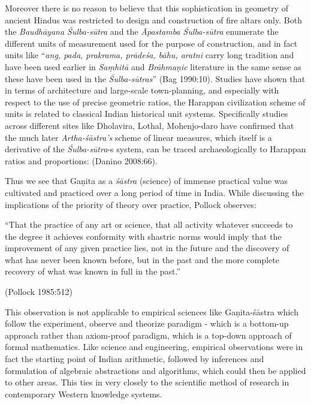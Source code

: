 Moreover there is no reason to believe that this sophistication in geometry of ancient Hindus was restricted to design and construction of fire altars only. Both the {\sl Baudhāyana Śulba-sūtra} and the {\sl Āpastamba Śulba-sūtra} enumerate the different units of measurement used for the purpose of construction, and in fact units like ``{\sl ang, pada, prakrama, prādeśa, bāhu, aratni} carry long tradition and have been used earlier in {\sl Saṃhitā} and {\sl Brāhmaṇic} literature in the same sense as these have been used in the {\sl Śulba-sūtras}'' (Bag 1990:10). Studies have shown that in terms of architecture and large-scale town-planning, and especially with respect to the use of precise geometric ratios, the Harappan civilization scheme of units is related to classical Indian historical unit systems. Specifically studies across different sites like Dholavira, Lothal, Mohenjo-daro have confirmed that the much later {\sl Artha-śāstra’s} scheme of linear measures, which itself is a derivative of the {\sl Śulba-sūtra}-s system, can be traced archaeologically to Harappan ratios and proportions: (Danino 2008:66).

Thus we see that Gaṇita as a {\sl śāstra} (science) of immense practical value was cultivated and practiced over a long period of time in India. While discussing the implications of the priority of theory over practice, Pollock observes: 
\begin{myquote}
``That the practice of any art or science, that all activity whatever succeeds to the degree it achieves conformity with shastric norms would imply that the improvement of any given practice lies, not in the future and the discovery of what has never been known before, but in the past and the more complete recovery of what was known in full in the past.''

\hfill (Pollock 1985:512)
\end{myquote}

This observation is not applicable to empirical sciences like Gaṇita-śāstra which follow the experiment, observe and theorize paradigm - which is a bottom-up approach rather than axiom-proof paradigm, which is a top-down approach of formal mathematics. Like science and engineering, empirical observations were in fact the starting point of Indian arithmetic, followed by inferences and formulation of algebraic abstractions and algorithms, which could then be applied to other areas. This ties in very closely to the scientific method of research in contemporary Western knowledge systems.


